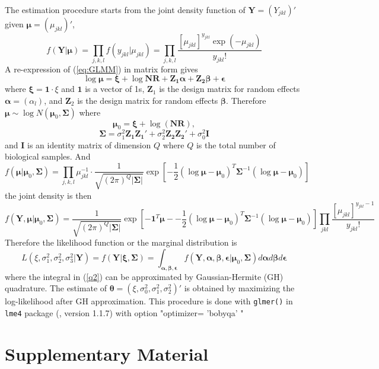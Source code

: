\documentclass[11pt, a4paper]{article}
\begin{document}
The estimation procedure starts from the joint density function of $\bm Y=(Y_{jkl})'$ given $\bm \mu= (\mu_{jkl})'$, 
\[f(\bm Y|\bm \mu )=\prod_{ j, k,l}f(y_{jkl}|\mu_{jkl})=\prod_{j,k,l}\frac{[\mu_{jkl}]^{y_{jkl}}\exp(-\mu_{jkl})}{y_{jkl}!}\]
A re-expression of  (\ref{eq:GLMM}) in matrix form gives 
\[\log\bm \mu= \bm \xi + \log{\bm{NR}} + \bm {Z_1\alpha} + \bm{Z_2\beta} + \bm \epsilon \]
where $\bm \xi = \bm 1\cdot\xi$ and $\bm 1$ is a vector of 1s, $\bm Z_1$ is the design matrix for random effects $\bm \alpha=(\alpha_l)$, and $\bm Z_2$ is the design matrix for random effects $\bm \beta $. 
Therefore  $\bm\mu  \sim \log N(\bm \mu_0, \bm \Sigma)$ where 
$$\bm \mu_0 =\bm\xi + \log(\bm {NR}),$$ 
$$\bm \Sigma = \sigma_1^2\bm {Z_1Z_1'} + \sigma_2^2\bm {Z_2 Z_2'} +\sigma_0^2 \bm I$$
and $\bm I$ is an identity matrix of dimension $Q$ where $Q$ is the total number of biological samples. 
And 
\[f(\bm \mu |\bm \mu_0, \bm \Sigma)=\prod_{j,k,l} \mu_{jkl}^{-1}\cdot \frac{1}{ \sqrt{(2\pi)^Q|\bm\Sigma|}}\exp[-\frac{1}{2} {(\log\bm \mu - \bm \mu_0)^T\bm \Sigma^{-1}(\log\bm \mu - \bm \mu_0)}]\]
the joint density is then
\[f(\bm Y, \bm \mu |\bm \mu_0, \bm \Sigma) =\frac{1}{\sqrt{(2\pi)^Q|\bm \Sigma|}}\exp[-\bm 1^T\bm \mu - -\frac{1}{2} {(\log\bm \mu - \bm \mu_0)^T\bm \Sigma^{-1}(\log\bm \mu - \bm \mu_0)}]\prod_{jkl}\frac{[\mu_{jkl}]^{y_{jkl}-1}}{y_{jkl}!}\]
Therefore the likelihood function or the marginal distribution is 
\begin{equation}\label{q2}
L(\xi, \sigma_1^2, \sigma_2^2, \sigma_3^2|\bm Y)=f(\bm Y|\bm \xi, \bm \Sigma)= \int_{\bm{\alpha,\beta,\epsilon}} f(\bm Y, \bm \alpha, \bm \beta, \bm \epsilon |\bm \mu_0, \bm \Sigma)d\bm \alpha d \bm\beta d\bm \epsilon 
\end{equation}
where the integral in (\ref{q2}) can be approximated by Gaussian-Hermite (GH) quadrature. The estimate of $\bm\theta = (\xi, \sigma_0^2, \sigma_1^2, \sigma_2^2)'$ is obtained by maximizing the log-likelihood after GH approximation.  This procedure is done with \verb"glmer()"  in \verb"lme4"  package (\cite{bates2012lme4}, version 1.1.7)  with option  "optimizer= 'bobyqa' " 


\section{Supplementary Material}
\end{document}
